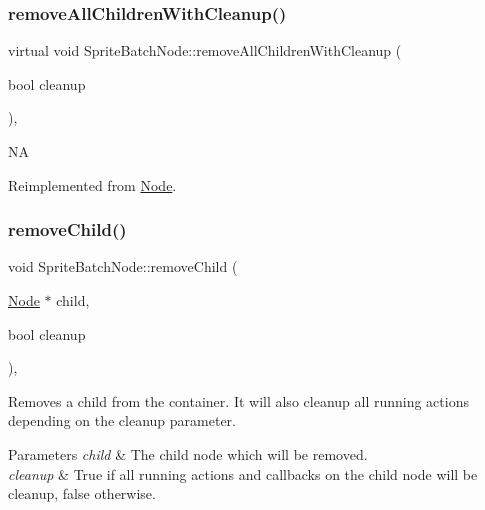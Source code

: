 \subsubsection{\texorpdfstring{remove\+All\+Children\+With\+Cleanup()}{removeAllChildrenWithCleanup()}\hspace{0.1cm}{\footnotesize\ttfamily [2/2]}}
{\footnotesize\ttfamily virtual void Sprite\+Batch\+Node\+::remove\+All\+Children\+With\+Cleanup (\begin{DoxyParamCaption}\item[{bool}]{cleanup }\end{DoxyParamCaption})\hspace{0.3cm}{\ttfamily [override]}, {\ttfamily [virtual]}}

NA 

Reimplemented from \hyperlink{classNode_aca66e2b385c3dbf1a6f55627c4a13192}{Node}.

\mbox{\label{classSpriteBatchNode_a7bebdfd28805ed83d0a78b49f8b52803}} 
\subsubsection{\texorpdfstring{remove\+Child()}{removeChild()}\hspace{0.1cm}{\footnotesize\ttfamily [1/2]}}
{\footnotesize\ttfamily void Sprite\+Batch\+Node\+::remove\+Child (\begin{DoxyParamCaption}\item[{\hyperlink{classNode}{Node} $\ast$}]{child,  }\item[{bool}]{cleanup }\end{DoxyParamCaption})\hspace{0.3cm}{\ttfamily [override]}, {\ttfamily [virtual]}}

Removes a child from the container. It will also cleanup all running actions depending on the cleanup parameter.


\begin{DoxyParams}{Parameters}
{\em child} & The child node which will be removed. \\
\hline
{\em cleanup} & True if all running actions and callbacks on the child node will be cleanup, false otherwise. \\
\hline
\end{DoxyParams}


